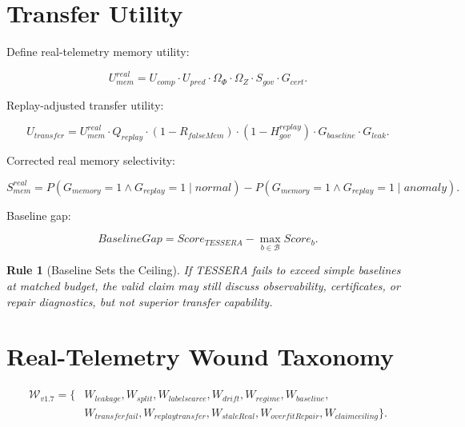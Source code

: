 \documentclass[12pt]{article}
\newtheorem{rulebox}{Rule}
\begin{document}
\section{Transfer Utility}

Define real-telemetry memory utility:

\[
U^{real}_{mem}=U_{comp}\cdot U_{pred}\cdot \Omega_{\Phi}\cdot \Omega_Z\cdot S_{gov}\cdot G_{cert}.
\]

Replay-adjusted transfer utility:

\[
\boxed{
U_{transfer}=U^{real}_{mem}\cdot Q_{replay}\cdot (1-R_{falseMem})\cdot
(1-H^{replay}_{gov})\cdot G_{baseline}\cdot G_{leak}.
}
\]

Corrected real memory selectivity:

\[
S^{real}_{mem}=P(G_{memory}=1\wedge G_{replay}=1\mid normal)
-P(G_{memory}=1\wedge G_{replay}=1\mid anomaly).
\]

Baseline gap:

\[
BaselineGap=Score_{TESSERA}-\max_{b\in\mathcal{B}}Score_b.
\]

\begin{rulebox}[Baseline Sets the Ceiling]
If TESSERA fails to exceed simple baselines at matched budget, the valid claim
may still discuss observability, certificates, or repair diagnostics, but not
superior transfer capability.
\end{rulebox}

\section{Real-Telemetry Wound Taxonomy}

\[
\begin{aligned}
\mathcal{W}_{v1.7}=\{&W_{leakage},W_{split},W_{labelscarce},W_{drift},W_{regime},
W_{baseline},\\
&W_{transferfail},W_{replaytransfer},W_{staleReal},W_{overfitRepair},
W_{claimceiling}\}.
\end{aligned}
\]
\end{document}
